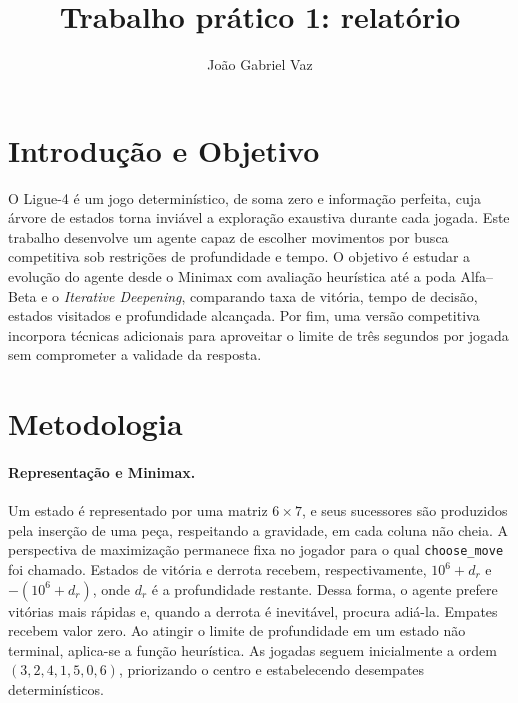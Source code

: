 \documentclass[letterpaper]{article} %
\title{Trabalho prático 1: relatório}
\author{
    João Gabriel Vaz
}
\begin{document}
\maketitle

\section{Introdução e Objetivo}

O Ligue-4 é um jogo determinístico, de soma zero e informação perfeita, cuja árvore de estados torna inviável a exploração exaustiva durante cada jogada. Este trabalho desenvolve um agente capaz de escolher movimentos por busca competitiva sob restrições de profundidade e tempo. O objetivo é estudar a evolução do agente desde o Minimax com avaliação heurística até a poda Alfa--Beta e o \textit{Iterative Deepening}, comparando taxa de vitória, tempo de decisão, estados visitados e profundidade alcançada. Por fim, uma versão competitiva incorpora técnicas adicionais para aproveitar o limite de três segundos por jogada sem comprometer a validade da resposta.

\section{Metodologia}

\paragraph{Representação e Minimax.}
Um estado é representado por uma matriz $6 \times 7$, e seus sucessores são produzidos pela inserção de uma peça, respeitando a gravidade, em cada coluna não cheia. A perspectiva de maximização permanece fixa no jogador para o qual \texttt{choose\_move} foi chamado. Estados de vitória e derrota recebem, respectivamente, $10^6+d_r$ e $-(10^6+d_r)$, onde $d_r$ é a profundidade restante. Dessa forma, o agente prefere vitórias mais rápidas e, quando a derrota é inevitável, procura adiá-la. Empates recebem valor zero. Ao atingir o limite de profundidade em um estado não terminal, aplica-se a função heurística. As jogadas seguem inicialmente a ordem $(3,2,4,1,5,0,6)$, priorizando o centro e estabelecendo desempates determinísticos.
\end{document}
